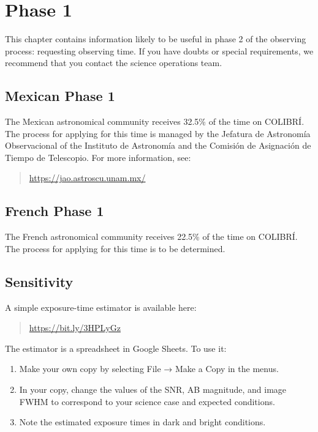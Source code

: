 \chapter{Phase 1}
\label{chapter:phase-1}

This chapter contains information likely to be useful in phase 2 of the observing process: requesting observing time. If you have doubts or special requirements, we recommend that you contact the science operations team.

\section{Mexican Phase 1}

The Mexican astronomical community receives 32.5\% of the time on COLIBRÍ. The process for applying for this time is managed by the Jefatura de Astronomía Observacional of the Instituto de Astronomía and the Comisión de Asignación de Tiempo de Telescopio. For more information, see:

\begin{quote}
\url{https://jao.astroscu.unam.mx/}
\end{quote}

\section{French Phase 1}

The French astronomical community receives 22.5\% of the time on COLIBRÍ. The process for applying for this time is to be determined.

\section{Sensitivity}

A simple exposure-time estimator is available here:

\begin{quote}
\url{https://bit.ly/3HPLyGz}
\end{quote}

The estimator is a spreadsheet in Google Sheets. To use it:
\begin{enumerate}
\item 
Make your own copy by selecting File → Make a Copy in the menus.
\item
In your copy, change the values of the SNR, AB magnitude, and image FWHM to correspond to your science case and expected conditions.
\item 
Note the estimated exposure times in dark and bright conditions.
\end{enumerate}

